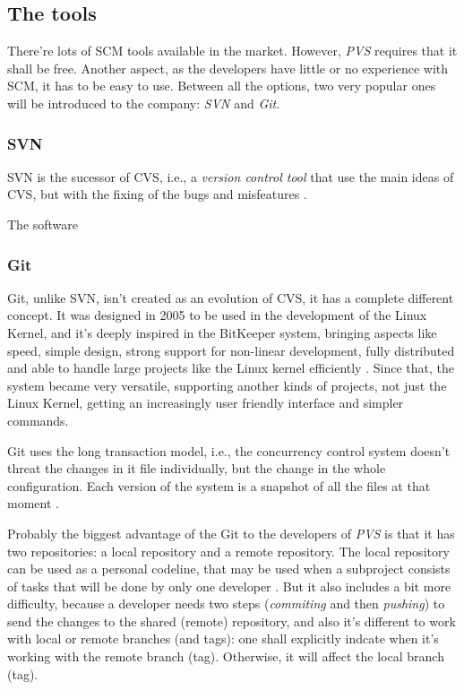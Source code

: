 \documentclass[a4paper]{article}
\begin{document}
\subsection{The tools}

There're lots of SCM tools available in the market. However, \emph{PVS} requires that it shall be free.
Another aspect, as the developers have little or no experience with SCM, it has to be easy to use.
Between all the options, two very popular ones will be introduced to the company: \emph{SVN} and \emph{Git}.

\subsubsection{SVN}

SVN is the sucessor of CVS, i.e., a \emph{version control tool} that use the main ideas of CVS, but with the fixing of the bugs and misfeatures \cite{collins-sussman}.

The software

\subsubsection{Git}

Git, unlike SVN, isn't created as an evolution of CVS, it has a complete different concept.
It was designed in 2005 to be used in the development of the Linux Kernel, and it's deeply inspired in the BitKeeper system, bringing aspects like speed, simple design, strong support for non-linear development, fully distributed and able to handle large projects like the Linux kernel efficiently \cite{chacon}.
Since that, the system became very versatile, supporting another kinds of projects, not just the Linux Kernel, getting an increasingly user friendly interface and simpler commands.

Git uses the long transaction model, i.e., the concurrency control system doesn't threat the changes in it file individually, but the change in the whole configuration. Each version of the system is a snapshot of all the files at that moment \cite{chacon}.

Probably the biggest advantage of the Git to the developers of \emph{PVS} is that it has two repositories: a local repository and a remote repository.
The local repository can be used as a personal codeline, that may be used when a subproject consists of tasks that will be done by only one developer \cite{appleton}.
But it also includes a bit more difficulty, because a developer needs two steps (\emph{commiting} and then \emph{pushing}) to send the changes to the shared (remote) repository, and also it's different to work with local or remote branches (and tags): one shall explicitly indcate when it's working with the remote branch (tag). 
Otherwise, it will affect the local branch (tag).
\end{document}

